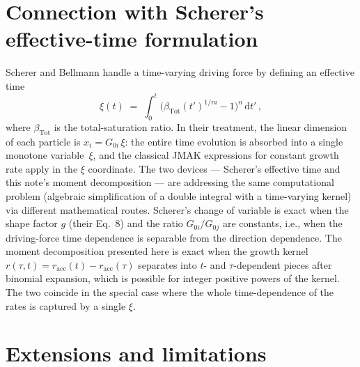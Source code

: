 \documentclass[11pt]{article}
\begin{document}
\section{Connection with Scherer's effective-time formulation}

Scherer and Bellmann\cite{Scherer2018} handle a time-varying driving
force by defining an effective time
\begin{equation}
\xi(t) \;=\; \int_{0}^{t} \bigl(\beta_{\text{Tot}}(t')^{1/m} - 1\bigr)^{n}\, \mathrm{d}t'\,,
\label{eq:scherer-xi}
\end{equation}
where $\beta_{\text{Tot}}$ is the total-saturation ratio.
In their treatment, the linear dimension of each particle is
$x_i = G_{0i}\, \xi$: the entire time evolution is absorbed into a
single monotone variable~$\xi$, and the classical JMAK expressions
for constant growth rate apply in the $\xi$ coordinate.
The two devices — Scherer's effective time and this note's moment
decomposition — are addressing the same computational problem
(algebraic simplification of a double integral with a time-varying
kernel) via different mathematical routes.
Scherer's change of variable is exact when the shape factor $g$
(their Eq.~8) and the ratio $G_{0i}/G_{0j}$ are constants, i.e., when
the driving-force time dependence is separable from the direction
dependence.
The moment decomposition presented here is exact when the growth
kernel $r(\tau, t) = r_{\text{acc}}(t) - r_{\text{acc}}(\tau)$
separates into $t$- and $\tau$-dependent pieces after binomial
expansion, which is possible for integer positive powers of the
kernel.
The two coincide in the special case where the whole time-dependence
of the rates is captured by a single $\xi$.

\section{Extensions and limitations}
\end{document}
